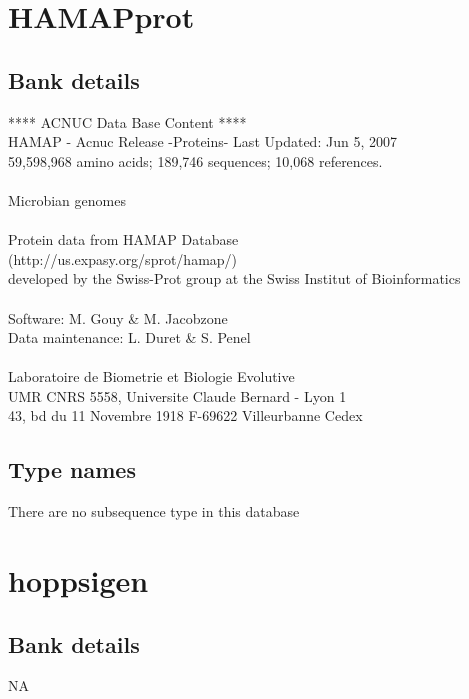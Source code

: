 \documentclass{article}
\begin{document}
\begin{Schunk}
\section{ HAMAPprot }
\subsection{Bank details}
               ****     ACNUC Data Base Content      ****                       \\
          HAMAP - Acnuc Release -Proteins- Last Updated: Jun  5, 2007\\
          59,598,968 amino acids; 189,746 sequences; 10,068 references.\\
	  \\
	                   Microbian genomes\\
			 \\
                    Protein data from  HAMAP Database\\
	          (http://us.expasy.org/sprot/hamap/)\\
developed by the Swiss-Prot group at the Swiss Institut of Bioinformatics\\
  \\
Software: M. Gouy \& M. Jacobzone\\
Data maintenance: L. Duret \& S. Penel\\
 \\
Laboratoire de Biometrie et Biologie Evolutive\\
UMR CNRS 5558, Universite Claude Bernard - Lyon 1 \\
43, bd du 11 Novembre 1918 F-69622 Villeurbanne Cedex\\
 

\subsection{Type names}
There are no subsequence type in this database
\section{ hoppsigen }
\subsection{Bank details}
NA


\end{Schunk}
\end{document}
